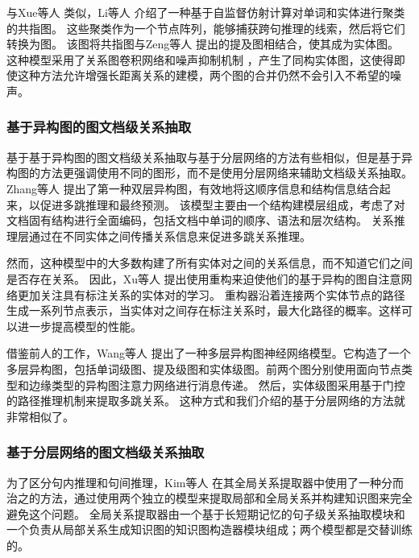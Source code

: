 \documentclass[bachelor]{thesis-uestc}
\begin{document}
与Xue等人 \cite{y2020-coreferential}类似，Li等人 \cite{LI2022109146}介绍了一种基于自监督仿射计算对单词和实体进行聚类的共指图。
这些聚类作为一个节点阵列，能够捕获跨句推理的线索，然后将它们转换为图。
该图将共指图与Zeng等人 \cite{GAIN}提出的提及图相结合，使其成为实体图。
这种模型采用了关系图卷积网络和噪声抑制机制 \cite{y2020-coreferential}，产生了同构实体图，这使得即使这种方法允许增强长距离关系的建模，两个图的合并仍然不会引入不希望的噪声。\par

\subsubsection{基于异构图的图文档级关系抽取}\label{subsec:heterogeneous-graph}
基于基于异构图的图文档级关系抽取与基于分层网络的方法有些相似，但是基于异构图的方法更强调使用不同的图形，而不是使用分层网络来辅助文档级关系抽取。
Zhang等人 \cite{zhang-etal-2020-document}提出了第一种双层异构图，有效地将这顺序信息和结构信息结合起来，以促进多跳推理和最终预测。
该模型主要由一个结构建模层组成，考虑了对文档固有结构进行全面编码，包括文档中单词的顺序、语法和层次结构。
关系推理层通过在不同实体之间传播关系信息来促进多跳关系推理。\par

然而，这种模型中的大多数构建了所有实体对之间的关系信息，而不知道它们之间是否存在关系。
因此，Xu等人 \cite{Xu2020DocumentLevelRE}提出使用重构来迫使他们的基于异构的图自注意网络更加关注具有标注关系的实体对的学习。
重构器沿着连接两个实体节点的路径生成一系列节点表示，当实体对之间存在标注关系时，最大化路径的概率。这样可以进一步提高模型的性能。 \par

借鉴前人的工作，Wang等人 \cite{zhang-etal-2020-document} 提出了一种多层异构图神经网络模型。它构造了一个多层异构图，包括单词级图、提及级图和实体级图。前两个图分别使用面向节点类型和边缘类型的异构图注意力网络进行消息传递。
然后，实体级图采用基于门控的路径推理机制来提取多跳关系。
这种方式和我们介绍的基于分层网络的方法就非常相似了。\par

\subsubsection{基于分层网络的图文档级关系抽取}\label{subsec:layered-graph}

为了区分句内推理和句间推理，Kim等人 \cite{app10031181} 在其全局关系提取器中使用了一种分而治之的方法，通过使用两个独立的模型来提取局部和全局关系并构建知识图来完全避免这个问题。
全局关系提取器由一个基于长短期记忆的句子级关系抽取模块和一个负责从局部关系生成知识图的知识图构造器模块组成；两个模型都是交替训练的。\par
\end{document}
